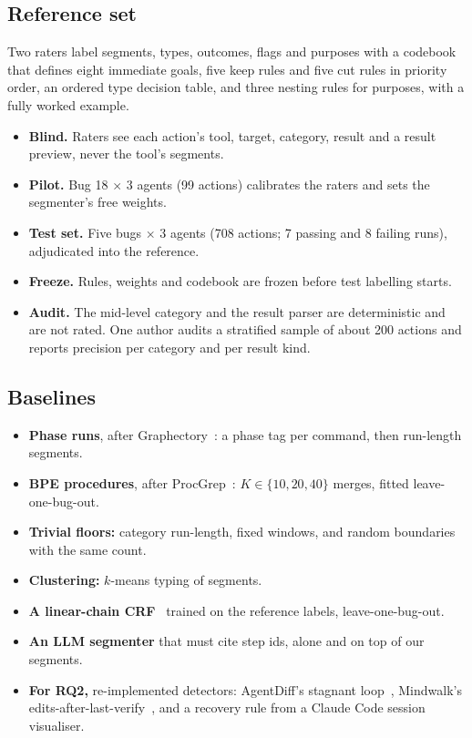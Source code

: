 \documentclass[sigconf,nonacm,10pt]{acmart}
\begin{document}
\subsection{Reference set}
Two raters label segments, types, outcomes, flags and purposes with a codebook that
defines eight immediate goals, five keep rules and five cut rules in priority order, an
ordered type decision table, and three nesting rules for purposes, with a fully worked
example.
\begin{itemize}
  \item \textbf{Blind.} Raters see each action's tool, target, category, result and a
        result preview, never the tool's segments.
  \item \textbf{Pilot.} Bug 18 $\times$ 3 agents (99 actions) calibrates the raters
        and sets the segmenter's free weights.
  \item \textbf{Test set.} Five bugs $\times$ 3 agents (708 actions; 7 passing and 8
        failing runs), adjudicated into the reference.
  \item \textbf{Freeze.} Rules, weights and codebook are frozen before test labelling
        starts.
  \item \textbf{Audit.} The mid-level category and the result parser are deterministic
        and are not rated. One author audits a stratified sample of about 200 actions
        and reports precision per category and per result kind.
\end{itemize}

\subsection{Baselines}
\begin{itemize}
  \item \textbf{Phase runs}, after Graphectory~\cite{graphectory2026}: a phase tag per
        command, then run-length segments.
  \item \textbf{BPE procedures}, after ProcGrep~\cite{oderinwale2026procgrep}: $K\in\{10,20,40\}$
        merges, fitted leave-one-bug-out.
  \item \textbf{Trivial floors:} category run-length, fixed windows, and random
        boundaries with the same count.
  \item \textbf{Clustering:} $k$-means typing of segments.
  \item \textbf{A linear-chain CRF}~\cite{lafferty2001crf,tax2016eventabstraction}
        trained on the reference labels, leave-one-bug-out.
  \item \textbf{An LLM segmenter} that must cite step ids, alone and on top of our
        segments.
  \item \textbf{For RQ2,} re-implemented detectors: AgentDiff's stagnant
        loop~\cite{agentdiff}, Mindwalk's edits-after-last-verify~\cite{mindwalk},
        and a recovery rule from a Claude Code session visualiser.
\end{itemize}
\end{document}
